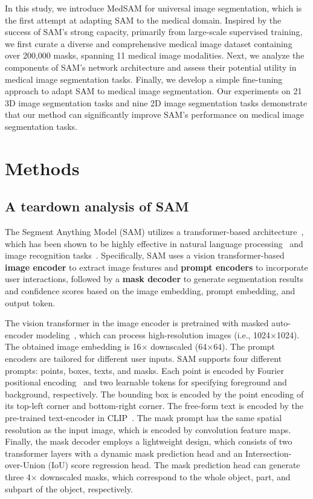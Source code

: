\documentclass[runningheads]{llncs}
\begin{document}
In this study, we introduce MedSAM for universal image segmentation, which is the first attempt at adapting SAM to the medical domain. Inspired by the success of SAM's strong capacity, primarily from large-scale supervised training, we first curate a diverse and comprehensive medical image dataset containing over 200,000 masks, spanning 11 medical image modalities. Next, we analyze the components of SAM's network architecture and assess their potential utility in medical image segmentation tasks. Finally, we develop a simple fine-tuning approach to adapt SAM to medical image segmentation. Our experiments on 21 3D image segmentation tasks and nine 2D image segmentation tasks demonstrate that our method can significantly improve SAM's performance on medical image segmentation tasks. 

\section{Methods}
\subsection{A teardown analysis of SAM}
The Segment Anything Model (SAM) utilizes a transformer-based architecture~\cite{attention-Nips17}, which has been shown to be highly effective in natural language processing~\cite{GPT-3} and image recognition tasks~\cite{ViT2020}. Specifically, SAM uses a vision transformer-based \textbf{image encoder} to extract image features and \textbf{prompt encoders} to incorporate user interactions, followed by a \textbf{mask decoder} to generate segmentation results and confidence scores based on the image embedding, prompt embedding, and output token. 

The vision transformer in the image encoder is pretrained with masked auto-encoder modeling~\cite{MAE}, which can process high-resolution images (i.e., 1024$\times$1024). The obtained image embedding is 16$\times$ downscaled (64$\times$64).
The prompt encoders are tailored for different user inputs. SAM supports four different prompts: points, boxes, texts, and masks. Each point is encoded by Fourier positional encoding~\cite{FourierPE-Nips20} and two learnable tokens for specifying foreground and background, respectively. The bounding box is encoded by the point encoding of its top-left corner and bottom-right corner. The free-form text is encoded by the pre-trained text-encoder in CLIP~\cite{CLIP-ICML2021}. The mask prompt has the same spatial resolution as the input image, which is encoded by convolution feature maps. 
Finally, the mask decoder employs a lightweight design, which consists of two transformer layers with a dynamic mask prediction head and an Intersection-over-Union (IoU) score regression head. The mask prediction head can generate three 4$\times$ downscaled masks, which correspond to the whole object, part, and subpart of the object, respectively.
\end{document}
